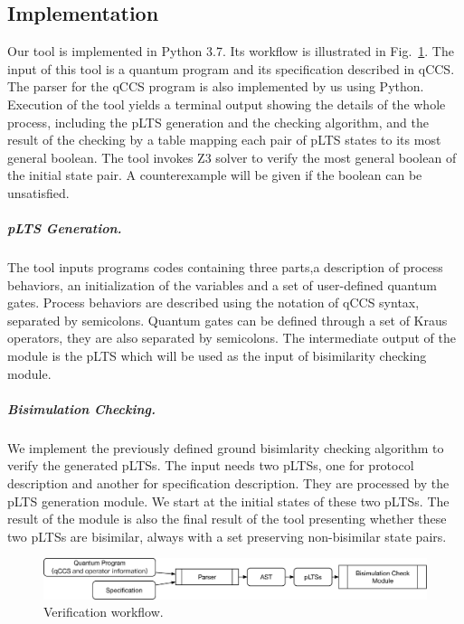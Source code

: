 \documentclass[a4paper,UKenglish,cleveref, autoref]{lipics-v2019}
\begin{document}
\subsection{Implementation}
Our tool is implemented in Python 3.7. Its workflow is illustrated in Fig.~\ref{fig:arch}. The input of this tool is a quantum program and its specification described in qCCS. The parser for the qCCS program is also implemented by us using Python. Execution of the tool yields a terminal output showing the details of the whole process, including the pLTS generation and the checking algorithm, and the result of the checking by a table mapping each pair of pLTS states to its most general boolean. The tool invokes Z3 solver to verify the most general boolean of the initial state pair. A counterexample will be given if the boolean can be unsatisfied.
\subparagraph*{pLTS Generation.}
The tool inputs programs codes containing three parts,a description of process behaviors, an initialization of the variables and a set of user-defined quantum gates. Process behaviors are described using the notation of qCCS syntax, separated by semicolons. Quantum gates can be defined through a set of Kraus operators, they are also separated by semicolons. The intermediate output of the module is the pLTS which will be used as the input of bisimilarity checking module.
\subparagraph*{Bisimulation Checking.}
We implement the previously defined ground bisimlarity checking algorithm to verify the generated pLTSs. The input needs two pLTSs, one for protocol description and another for specification description. They are processed by the pLTS generation module. We start at the initial states of these two pLTSs. The result of the module is also the final result of the tool presenting whether these two pLTSs are bisimilar, always with a set preserving non-bisimilar state pairs.
\begin{figure}
\centering
\includegraphics[width=\textwidth]{images/architecture.eps}
\caption{Verification workflow.}
\label{fig:arch}
\end{figure}
\end{document}
